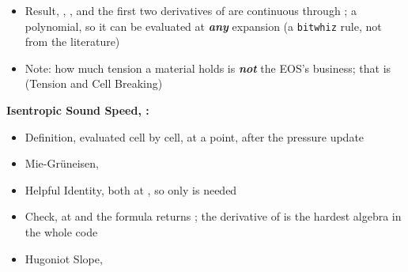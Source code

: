 \documentclass[11pt,addpoints]{exam}
\begin{document}
\begin{tcolorbox}[breakable]
\begin{itemize}
\item Result, \hspace{3mm} , , and the first two derivatives of  are continuous through ; a polynomial, so it can be evaluated at \textbf{\emph{any}} expansion (a \texttt{bitwhiz} rule, not from the literature)\vspace{.5em}
\item Note: how much tension a material holds is \textbf{\emph{not}} the EOS's business; that is  (Tension and Cell Breaking)
\end{itemize}
\end{tcolorbox}

\clearpage

\begin{tcolorbox}[breakable]
\textbf{Isentropic Sound Speed, :}\vspace{.5em}
\begin{itemize}
\item Definition, \hspace{3mm}  \hspace{7mm} evaluated cell by cell, at a point, after the pressure update\vspace{.5em}
\item Mie-Gr\"uneisen, \hspace{3mm}  \vspace{.5em}
\item Helpful Identity, \hspace{3mm}  \hspace{5mm} both at , so only  is needed\vspace{.5em}
\item Check, \hspace{3mm} at  and  the formula returns ; the derivative of  is the hardest algebra in the whole code\vspace{.5em}
\item Hugoniot Slope, \hspace{3mm} \vspace{1em}\\

\end{itemize}
\end{tcolorbox}
\end{document}
